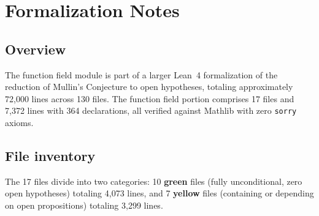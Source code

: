 \section{Formalization Notes}\label{sec:formalization}

\subsection{Overview}

The function field module is part of a larger Lean~4 formalization of the
reduction of Mullin's Conjecture to open hypotheses, totaling approximately
72{,}000 lines across 130 files. The function field portion comprises 17
files and 7{,}372 lines with 364 declarations, all verified against
Mathlib with zero \texttt{sorry} axioms.

\subsection{File inventory}

The 17 files divide into two categories: 10 \textbf{green} files (fully
unconditional, zero open hypotheses) totaling 4{,}073 lines, and 7
\textbf{yellow} files (containing or depending on open propositions)
totaling 3{,}299 lines.

